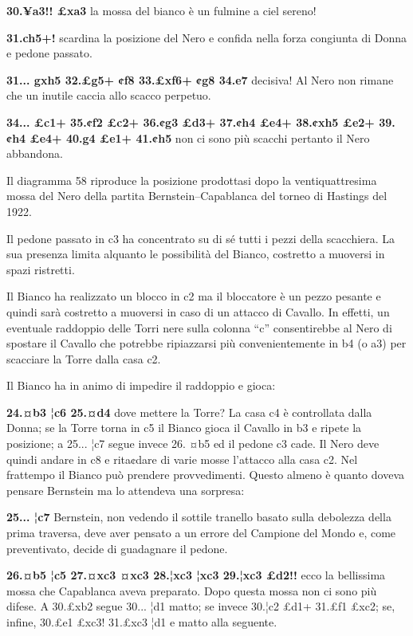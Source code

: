 \textbf{30.¥a3!! £xa3} la mossa del bianco è un fulmine a ciel sereno!

\textbf{31.ch5+!} scardina la posizione del Nero e confida nella forza
congiunta di Donna e pedone passato.

\textbf{31... gxh5 32.£g5+ ¢f8 33.£xf6+ ¢g8 34.e7} decisiva! Al Nero non
rimane che un inutile caccia allo scacco perpetuo.

\textbf{34... £c1+ 35.¢f2 £c2+ 36.¢g3 £d3+ 37.¢h4 £e4+ 38.¢xh5 £e2+
39.¢h4 £e4+ 40.g4 £e1+ 41.¢h5} non ci sono più scacchi pertanto il Nero
abbandona.

Il diagramma 58 riproduce la posizione prodottasi dopo la
ventiquattresima mossa del Nero della partita Bernstein--Capablanca del
torneo di Hastings del 1922.


Il pedone passato in c3 ha concentrato su di sé tutti i pezzi della
scacchiera. La sua presenza limita alquanto le possibilità del Bianco,
costretto a muoversi in spazi ristretti.

Il Bianco ha realizzato un blocco in c2 ma il bloccatore è un pezzo
pesante e quindi sarà costretto a muoversi in caso di un attacco di
Cavallo. In effetti, un eventuale raddoppio delle Torri nere sulla
colonna ``c'' consentirebbe al Nero di spostare il Cavallo che potrebbe
ripiazzarsi più convenientemente in b4 (o a3) per scacciare la Torre
dalla casa c2.

Il Bianco ha in animo di impedire il raddoppio e gioca:

\textbf{24.¤b3 ¦c6 25.¤d4} dove mettere la Torre? La casa c4 è
controllata dalla Donna; se la Torre torna in c5 il Bianco gioca il
Cavallo in b3 e ripete la posizione; a 25... ¦c7 segue invece 26. ¤b5 ed
il pedone c3 cade. Il Nero deve quindi andare in c8 e rita¢dare di varie
mosse l'attacco alla casa c2. Nel frattempo il Bianco può prendere
provvedimenti. Questo almeno è quanto doveva pensare Bernstein ma lo
attendeva una sorpresa:

\textbf{25... ¦c7} Bernstein, non vedendo il sottile tranello basato
sulla debolezza della prima traversa, deve aver pensato a un errore del
Campione del Mondo e, come preventivato, decide di guadagnare il pedone.

\textbf{26.¤b5 ¦c5 27.¤xc3 ¤xc3 28.¦xc3 ¦xc3 29.¦xc3 £d2!!} ecco la
bellissima mossa che Capablanca aveva preparato. Dopo questa mossa non
ci sono più difese. A 30.£xb2 segue 30... ¦d1 matto; se invece 30.¦c2
£d1+ 31.£f1 £xc2; se, infine, 30.£e1 £xc3! 31.£xc3 ¦d1 e matto alla
seguente.

